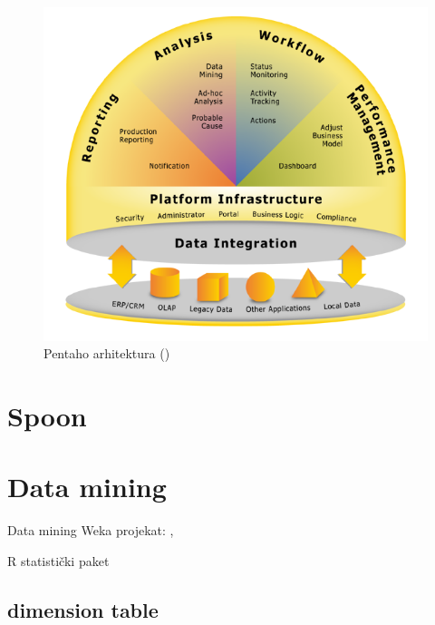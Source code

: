 \documentclass[times, utf8, seminar]{fit}
\begin{document}
\begin{figure}[h]
\centering
\includegraphics[width=15cm]{img/pentaho_arhitektura_eric.png}
\caption{Pentaho arhitektura (\cite{web:eric})}
\end{figure}



\section{Spoon}



\section{Data mining}

Data mining Weka projekat: \cite{web:weka}, \cite{web:pentaho_weka}

R statistički paket \cite{web:r}

\subsection{dimension table}
\end{document}
